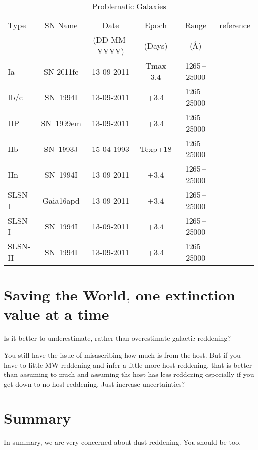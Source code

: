 \documentclass[twocolumn]{aastex61}
\begin{document}
\begin{table*}
\caption{Problematic Galaxies}
\label{table_templates}
\begin{tabular}{lccccc}
\hline
\hline
Type    & SN Name & Date & Epoch & Range & reference \\
        &         & (DD-MM-YYYY) & (Days) & (\AA) &  \\
\hline
Ia      & SN 2011fe & 13-09-2011 & Tmax 3.4 & 1265 – 25000 &   \\
Ib/c    & SN~1994I  & 13-09-2011 & +3.4 & 1265 – 25000 &  \\
IIP     & SN~1999em  & 13-09-2011 & +3.4 & 1265 – 25000 &   \\
IIb     & SN~1993J  & 15-04-1993 & Texp+18 & 1265 – 25000 &   \\
IIn     & SN~1994I  & 13-09-2011 & +3.4 & 1265 – 25000 &   \\
SLSN-I  & Gaia16apd  & 13-09-2011 & +3.4 & 1265 – 25000 &   \\
SLSN-I  & SN~1994I  & 13-09-2011 & +3.4 & 1265 – 25000 &   \\
SLSN-II & SN~1994I  & 13-09-2011 & +3.4 & 1265 – 25000 &   \\



\hline
\hline
\end{tabular}
\end{table*}

\section{Saving the World, one extinction value at a time  \label{sec_templates}}

Is it better to underestimate, rather than overestimate galactic reddening?

You still have the issue of misascribing how much is from the host.  But if you have to little MW reddening and infer a little more host reddening, that is better than assuming to much and assuming the host has less reddening especially if you get down to no host reddening.  Just increase uncertainties?



\section{Summary\label{sec_summary}}

In summary, we are very concerned about dust reddening.  You should be too.

\acknowledgments




\vspace{5mm}




{}
\end{document}
